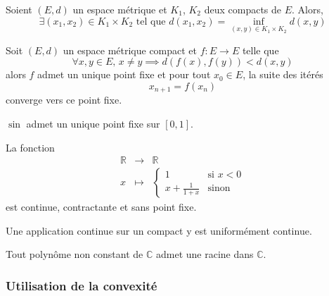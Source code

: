
	\begin{corollary}
		Soient $(E, d)$ un espace métrique et $K_1$, $K_2$ deux compacts de $E$. Alors,
		\[ \exists (x_1, x_2) \in K_1 \times K_2 \text{ tel que } d(x_1, x_2) = \inf_{(x,y) \in K_1 \times K_2} d(x,y) \]
	\end{corollary}


	\begin{corollary}
		Soit $(E,d)$ un espace métrique compact et $f : E \rightarrow E$ telle que
		\[ \forall x, y \in E, \, x \neq y \implies d(f(x), f(y)) < d(x,y) \]
		alors $f$ admet un unique point fixe et pour tout $x_0 \in E$, la suite des itérés
		\[ x_{n+1} = f(x_n) \]
		converge vers ce point fixe.
	\end{corollary}

	\begin{example}
		$\sin$ admet un unique point fixe sur $[0,1]$.
	\end{example}


	\begin{cexample}
		La fonction
		\[
		\begin{array}{ccc}
			\mathbb{R} &\rightarrow& \mathbb{R} \\
			x &\mapsto& \begin{cases}
				1 &\text{si } x < 0 \\
				x + \frac{1}{1+x} &\text{sinon}
			\end{cases}
		\end{array}
		\]
		est continue, contractante et sans point fixe.
	\end{cexample}


	\begin{corollary}
		Une application continue sur un compact y est uniformément continue.
	\end{corollary}


	\begin{application}
		Tout polynôme non constant de $\mathbb{C}$ admet une racine dans $\mathbb{C}$.
	\end{application}

	\subsubsection{Utilisation de la convexité}

